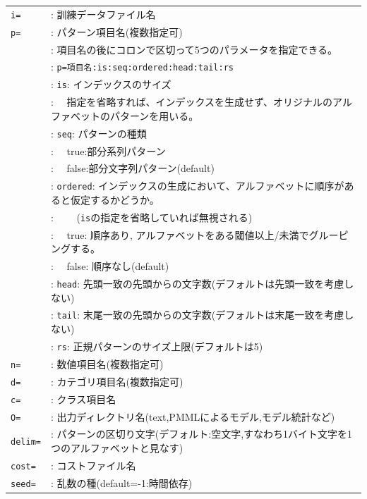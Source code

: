 \begin{table}[htbp]
{\small
\begin{tabular}{ll}

\verb|i=|     & : 訓練データファイル名 \\
\verb|p=|     & : パターン項目名(複数指定可) \\
              & : 項目名の後にコロンで区切って5つのパラメータを指定できる。 \\
              & : \verb|p=項目名:is:seq:ordered:head:tail:rs| \\
              & : \verb|is|: インデックスのサイズ \\
              & : \ \  指定を省略すれば、インデックスを生成せず、オリジナルのアルファベットのパターンを用いる。 \\
              & : \verb|seq|: パターンの種類 \\
              & : \ \ true:部分系列パターン \\
              & : \ \ false:部分文字列パターン(default) \\
              & : \verb|ordered|: インデックスの生成において、アルファベットに順序があると仮定するかどうか。 \\
              & : \ \ \ \ (\verb|is|の指定を省略していれば無視される) \\
              & : \ \ true: 順序あり, アルファベットをある閾値以上/未満でグルーピングする。 \\
              & : \ \ false: 順序なし(default) \\
              & : \verb|head|: 先頭一致の先頭からの文字数(デフォルトは先頭一致を考慮しない) \\
              & : \verb|tail|: 末尾一致の先頭からの文字数(デフォルトは末尾一致を考慮しない) \\
              & : \verb|rs|: 正規パターンのサイズ上限(デフォルトは5) \\
\verb|n=|     & : 数値項目名(複数指定可) \\
\verb|d=|     & : カテゴリ項目名(複数指定可) \\
\verb|c=|     & : クラス項目名 \\
\verb|O=|     & : 出力ディレクトリ名(text,PMMLによるモデル,モデル統計など) \\
\verb|delim=| & : パターンの区切り文字(デフォルト:空文字,すなわち1バイト文字を1つのアルファベットと見なす) \\
\verb|cost=|  & : コストファイル名 \\
\verb|seed=|  & : 乱数の種(default=-1:時間依存) \\

\end{tabular}}
\end{table}
